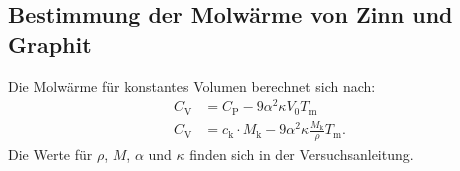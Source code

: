 \subsection{Bestimmung der Molwärme von Zinn und Graphit}
Die Molwärme für konstantes Volumen berechnet sich nach:
\begin{align}
  C_\mathrm{V} & =C_\mathrm{P}-9\alpha^2\kappa V_\mathrm{0}T_\mathrm{m}\\
  C_\mathrm{V} & =c_\mathrm{k}\cdot M_\mathrm{k}-9\alpha^2\kappa \frac{M_\mathrm{k}}{\rho}T_\mathrm{m}.
\end{align}
Die Werte für $\rho$, $M$, $\alpha$ und $\kappa$ finden sich in der Versuchsanleitung.
